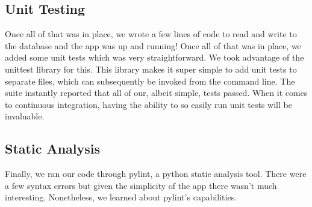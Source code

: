 \documentclass{article}
\begin{document}
\subsection{Unit Testing} 
Once all of that was in place, we wrote a few lines of code to read and write to the database and the app was up and running! Once all of that was in place, we added some unit tests which was very straightforward. We took advantage of the unittest library for this. This library makes it super simple to add unit tests to separate files, which can subsequently be invoked from the command line. The suite instantly reported that all of our, albeit simple, tests passed. When it comes to continuous integration, having the ability to so easily run unit tests will be invaluable.

\subsection{Static Analysis} 
Finally, we ran our code through pylint, a python static analysis tool. There were a few syntax errors but given the simplicity of the app there wasn't much interesting. Nonetheless, we learned about pylint's capabilities. 
\end{document}
